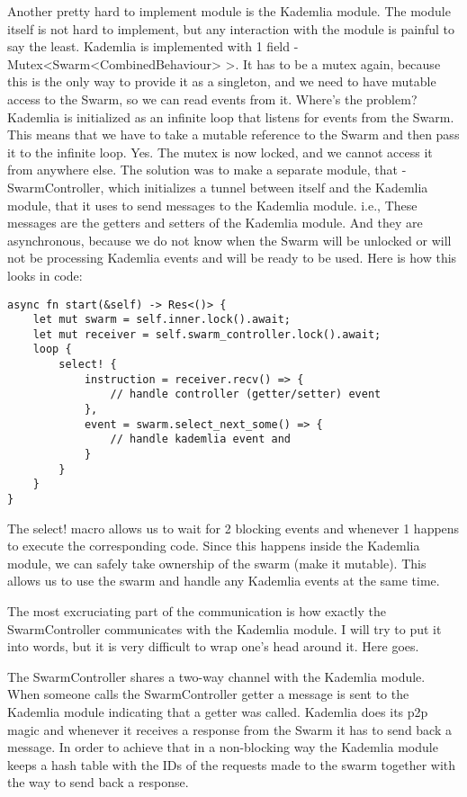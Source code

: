 \documentclass[ twoside,openright,titlepage,numbers=noenddot,headinclude,%
                footinclude=true,cleardoublepage=empty,abstractoff, %
                BCOR=5mm,paper=a4,fontsize=11pt,%
                ngerman,american,%
                ]{scrreprt}
\begin{document}
Another pretty hard to implement module is the Kademlia module.
The module itself is not hard to implement, but any interaction with the module is painful to say the least.
Kademlia is implemented with 1 field - Mutex<Swarm<CombinedBehaviour> >.
It has to be a mutex again, because this is the only way to provide it as a singleton,
and we need to have mutable access to the Swarm, so we can read events from it.
Where's the problem? Kademlia is initialized as an infinite loop that listens for events from the Swarm.
This means that we have to take a mutable reference to the Swarm and then pass it to the infinite loop.
Yes. The mutex is now locked, and we cannot access it from anywhere else.
The solution was to make a separate module, that - SwarmController,
which initializes a tunnel between itself and the Kademlia module,
that it uses to send messages to the Kademlia module.
i.e., These messages are the getters and setters of the Kademlia module.
And they are asynchronous, because we do not know when the Swarm will be unlocked or will not be processing
Kademlia events and will be ready to be used.
Here is how this looks in code:

\begin{verbatim}
async fn start(&self) -> Res<()> {
    let mut swarm = self.inner.lock().await;
    let mut receiver = self.swarm_controller.lock().await;
    loop {
        select! {
            instruction = receiver.recv() => {
                // handle controller (getter/setter) event
            },
            event = swarm.select_next_some() => {
                // handle kademlia event and
            }
        }
    }
}
\end{verbatim}

The select! macro allows us to wait for 2 blocking events and whenever 1 happens to execute the corresponding code.
Since this happens inside the Kademlia module, we can safely take ownership of the swarm (make it mutable).
This allows us to use the swarm and handle any Kademlia events at the same time.

The most excruciating part of the communication is how exactly
the SwarmController communicates with the Kademlia module.
I will try to put it into words, but it is very difficult to wrap one's head around it.
Here goes.

The SwarmController shares a two-way channel with the Kademlia module.
When someone calls the SwarmController getter a message is sent to the Kademlia module indicating
that a getter was called.
Kademlia does its p2p magic and whenever it receives a response from the Swarm it has to send back a message.
In order to achieve that in a non-blocking way the Kademlia module keeps a hash table with the IDs 
of the requests made to the swarm together with the way to send back a response.
\end{document}
